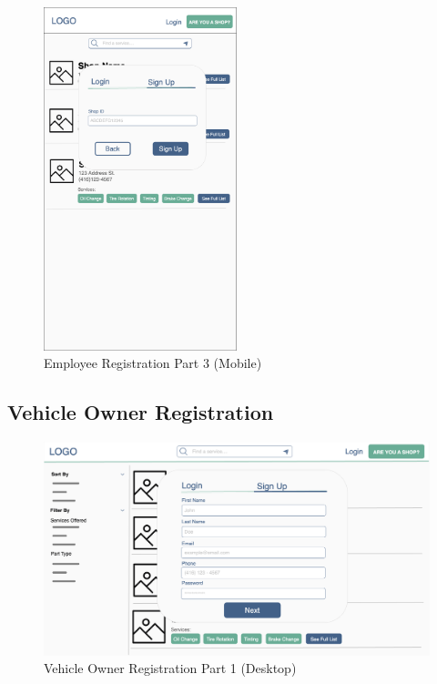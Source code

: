 \documentclass[12pt, titlepage]{article}
\begin{document}
\begin{figure}[H]
	\centering
	\includegraphics[width=0.5\textwidth]{mockups/Employee Signup (Part 2) (Mobile).png}
	\caption{Employee Registration \textemdash{} Part 3 (Mobile)}
\end{figure}

\subsection{Vehicle Owner Registration}

\begin{figure}[H]
	\centering
	\includegraphics[width=\textwidth]{mockups/Vehicle Owner Sign Up (Part 1) (Desktop).png}
	\caption{Vehicle Owner Registration \textemdash{} Part 1 (Desktop)}
\end{figure}
\end{document}
